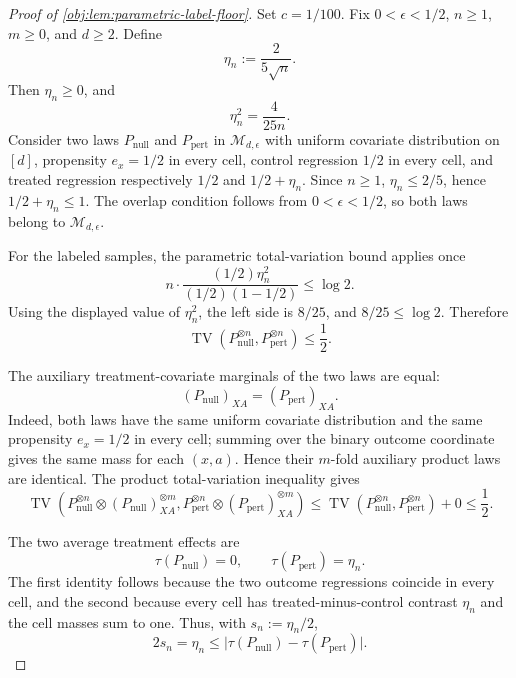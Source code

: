 \documentclass[11pt]{article}
\begin{document}
\begin{proof}[Proof of \cref{obj:lem:parametric-label-floor}]
Set \(c=1/100\). Fix \(0<\epsilon<1/2\), \(n\ge1\), \(m\ge0\), and \(d\ge2\). Define
\[
\eta_n:=\frac{2}{5\sqrt n}.
\]
Then \(\eta_n\ge0\), and
\[
\eta_n^2=\frac{4}{25n}.
\]
Consider two laws \(P_{\mathrm{null}}\) and \(P_{\mathrm{pert}}\) in \(\mathcal M_{d,\epsilon}\) with uniform covariate distribution on \([d]\), propensity \(e_x=1/2\) in every cell, control regression \(1/2\) in every cell, and treated regression respectively \(1/2\) and \(1/2+\eta_n\). Since \(n\ge1\), \(\eta_n\le2/5\), hence \(1/2+\eta_n\le1\). The overlap condition follows from \(0<\epsilon<1/2\), so both laws belong to \(\mathcal M_{d,\epsilon}\). %

For the labeled samples, the parametric total-variation bound applies once
\[
n\cdot \frac{(1/2)\eta_n^2}{(1/2)(1-1/2)}\le \log 2 .
\]
Using the displayed value of \(\eta_n^2\), the left side is \(8/25\), and \(8/25\le \log 2\). Therefore
\[
\operatorname{TV}\!\left(P_{\mathrm{null}}^{\otimes n},
P_{\mathrm{pert}}^{\otimes n}\right)\le \frac12 .
\]

The auxiliary treatment-covariate marginals of the two laws are equal:
\[
(P_{\mathrm{null}})_{XA}=(P_{\mathrm{pert}})_{XA}.
\]
Indeed, both laws have the same uniform covariate distribution and the same propensity \(e_x=1/2\) in every cell; summing over the binary outcome coordinate gives the same mass for each \((x,a)\). Hence their \(m\)-fold auxiliary product laws are identical. The product total-variation inequality gives
\[
\operatorname{TV}\!\left(
P_{\mathrm{null}}^{\otimes n}\otimes (P_{\mathrm{null}})_{XA}^{\otimes m},
P_{\mathrm{pert}}^{\otimes n}\otimes (P_{\mathrm{pert}})_{XA}^{\otimes m}
\right)
\le
\operatorname{TV}\!\left(P_{\mathrm{null}}^{\otimes n},P_{\mathrm{pert}}^{\otimes n}\right)+0
\le \frac12 .
\]

The two average treatment effects are
\[
\tau(P_{\mathrm{null}})=0,
\qquad
\tau(P_{\mathrm{pert}})=\eta_n.
\]
The first identity follows because the two outcome regressions coincide in every cell, and the second because every cell has treated-minus-control contrast \(\eta_n\) and the cell masses sum to one. Thus, with \(s_n:=\eta_n/2\),
\[
2s_n=\eta_n
\le
\bigl|\tau(P_{\mathrm{null}})-\tau(P_{\mathrm{pert}})\bigr|.
\]


\end{proof}
\end{document}

